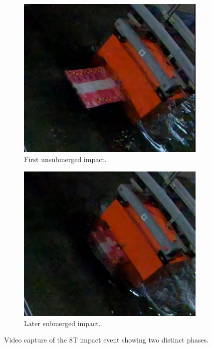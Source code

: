 \documentclass{article}
\begin{document}
\begin{figure}[htbp]
    \centering
    \begin{subfigure}[b]{0.6\textwidth}
        \centering
        \includegraphics[width=\textwidth]{first_impact.jpg}
        \caption{First unsubmerged impact.}
        \label{fig:first_impact}
    \end{subfigure}
    \hfill
    
    \begin{subfigure}[b]{0.6\textwidth}
        \centering
        \includegraphics[width=\textwidth]{second_impact.jpg}
        \caption{Later submerged impact.}
        \label{fig:second_impact}
    \end{subfigure}
    \caption{Video capture of the 8T impact event showing two distinct phases.}
    \label{fig:impact_combined}
    
\end{figure}
\end{document}
